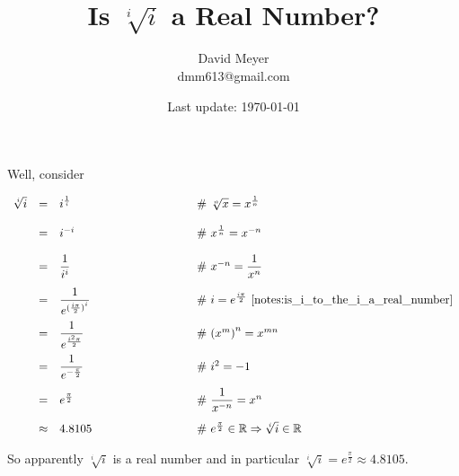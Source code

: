 \documentclass[11pt, oneside]{article}   	%
\begin{document}
\title {Is $\sqrt[i]{i}$ a Real Number?}
\author{David Meyer \\ dmm613@gmail.com}

\date{Last update: \today}							%
\maketitle

Well, consider

\begin{equation*}
\begin{array}{lllll}
\sqrt[i]{i}
&=& i^{\frac{1}{i}}			
		&\qquad \qquad \qquad \qquad \mathbin{\#} \text{ $\sqrt[n]{x} = x^{\frac{1}{n}}$} \\
[12pt]
&=& i^{-i}
		&\qquad \qquad \qquad \qquad \mathbin{\#} \text{ $x^{\frac{1}{n}} = x^{-n}$} \\
[12pt]
&=& \dfrac{1}{i^{i}}
		&\qquad \qquad \qquad \qquad \mathbin{\#} \text{ $x^{-n} = \dfrac{1}{x^{n}}$} \\
[12pt]
&=& \dfrac{1}{e^{{(\frac{i\pi}{2})}^i}}
		&\qquad \qquad \qquad \qquad \mathbin{\#} \text{ $i = e^{\frac{i \pi}{2}}$ 
		                                                 \cite{notes:is_i_to_the_i_a_real_number}} \\
[12pt]
&=& \dfrac{1}{e^{\frac{i^2\pi}{2}}}
		&\qquad \qquad \qquad \qquad \mathbin{\#} \text{ ${(x^m)}^n = x^{mn}$}  \\
[12pt]
&=& \dfrac{1}{e^{-\frac{\pi}{2}}}
		&\qquad \qquad \qquad \qquad \mathbin{\#} \text{ $i^2 = -1$} \\
[12pt]
&=& e^{\frac{\pi}{2}}
		&\qquad \qquad \qquad \qquad \mathbin{\#} \text{ $\dfrac{1}{x^{-n}} = x^{n}$} \\
[12pt]
&\approx& 4.8105
		&\qquad \qquad \qquad \qquad \mathbin{\#} \text{ $e^{\frac{\pi}{2}} \in \mathbb{R} 
														 \Rightarrow \sqrt[i]{i} \in \mathbb{R}$}
\end{array}
\end{equation*}

\bigskip
\noindent
So apparently $\sqrt[i]{i}$ is a real number and in particular $\sqrt[i]{i} = e^{\frac{\pi}{2}} \approx 4.8105$.
%
%
%
%
%
%
%
%


%
%
\end{document}
